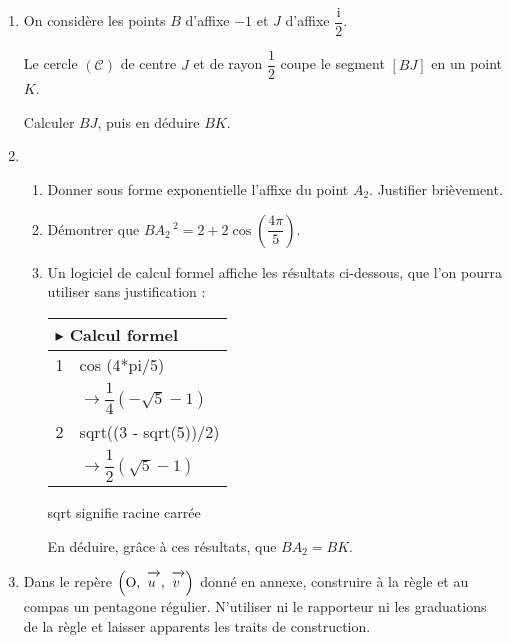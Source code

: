 \documentclass[12pt,a4paper,french]{article}
\theoremstyle{break}
\theoremstyle{plain}
\theoremstyle{nonumberplain}
\theoremstyle{nonumberbreak}
\newcommand{\vect}[1]{\mathchoice%
{\overrightarrow{\displaystyle\mathstrut#1\,\,}}%
{\overrightarrow{\textstyle\mathstrut#1\,\,}}%
{\overrightarrow{\scriptstyle\mathstrut#1\,\,}}%
{\overrightarrow{\scriptscriptstyle\mathstrut#1\,\,}}}
\def\Ouv{$\left(\text{O},~\vect{u},~\vect{v}\right)$}
\begin{document}
\begin{question}[ID=complexes;géométrie;bac;pondichery;2016]
\begin{enumerate}
\item On considère les points $B$ d'affixe $- 1$ et $J$ d'affixe $\dfrac{\text{i}}{2}$.

Le cercle $(\mathcal{C})$ de centre $J$ et de rayon $\dfrac{1}{2}$ coupe le segment $[BJ]$ en un point $K$.

Calculer $BJ$, puis en déduire $BK$.
\item 
	\begin{enumerate}
		\item Donner sous forme exponentielle l'affixe du point $A_2$. Justifier brièvement.
		\item Démontrer que $BA_2\,^2 = 2 +  2\cos \left(\dfrac{4\pi}{5}\right)$.
		\item Un logiciel de calcul formel affiche les résultats ci-dessous, que l'on pourra utiliser
sans justification :
\begin{center}
\begin{tabularx}{0.5\linewidth}{|c|X|}\hline
\multicolumn{2}{|l|}{$\blacktriangleright$ Calcul formel}\\\hline
1&cos (4*pi/5)\\
&\rule[-3mm]{0mm}{9mm}$\to \dfrac{1}{4}\left(- \sqrt{5} - 1\right)$\\ \hline
2&sqrt((3 - sqrt(5))/2)\\ \hline
&\rule[-3mm]{0mm}{9mm}$\to \dfrac{1}{2}\left(\sqrt{5} - 1\right)$\\ \hline
\end{tabularx}

\og sqrt \fg{} signifie \og racine carrée\fg
\end{center}

En   déduire, grâce à ces résultats, que $BA_2 = BK$.
 	\end{enumerate}
\item  Dans le repère \Ouv{} donné en annexe, construire à la règle et au compas un
pentagone régulier. N'utiliser ni le rapporteur ni les graduations de la règle et laisser
apparents les traits de construction.
\end{enumerate}

\end{question}
\end{document}
